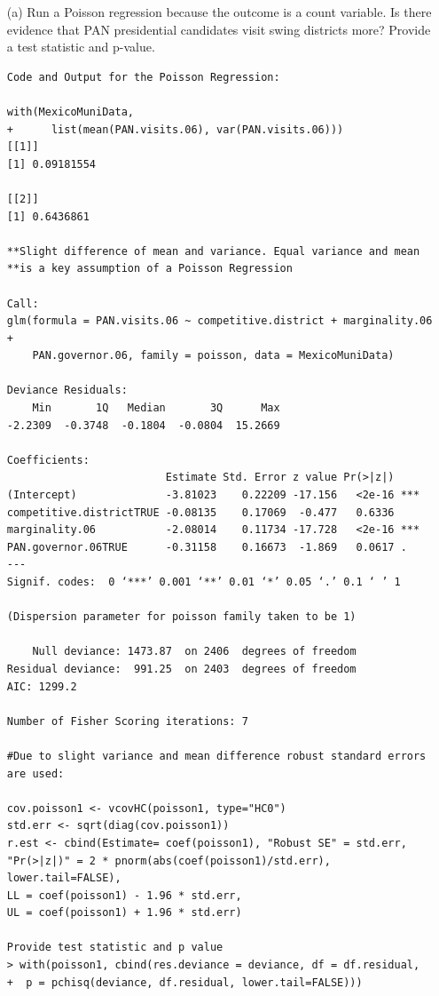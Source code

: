 \documentclass[12pt,letterpaper]{article}
\begin{document}
\begin{enumerate}
	\item [(a)]
	Run a Poisson regression because the outcome is a count variable. Is there evidence that PAN presidential candidates visit swing districts more? Provide a test statistic and p-value.

 \begin{verbatim}
Code and Output for the Poisson Regression:

with(MexicoMuniData,
+      list(mean(PAN.visits.06), var(PAN.visits.06)))
[[1]]
[1] 0.09181554

[[2]]
[1] 0.6436861

**Slight difference of mean and variance. Equal variance and mean
**is a key assumption of a Poisson Regression

Call:
glm(formula = PAN.visits.06 ~ competitive.district + marginality.06 + 
    PAN.governor.06, family = poisson, data = MexicoMuniData)

Deviance Residuals: 
    Min       1Q   Median       3Q      Max  
-2.2309  -0.3748  -0.1804  -0.0804  15.2669  

Coefficients:
                         Estimate Std. Error z value Pr(>|z|)    
(Intercept)              -3.81023    0.22209 -17.156   <2e-16 ***
competitive.districtTRUE -0.08135    0.17069  -0.477   0.6336    
marginality.06           -2.08014    0.11734 -17.728   <2e-16 ***
PAN.governor.06TRUE      -0.31158    0.16673  -1.869   0.0617 .  
---
Signif. codes:  0 ‘***’ 0.001 ‘**’ 0.01 ‘*’ 0.05 ‘.’ 0.1 ‘ ’ 1

(Dispersion parameter for poisson family taken to be 1)

    Null deviance: 1473.87  on 2406  degrees of freedom
Residual deviance:  991.25  on 2403  degrees of freedom
AIC: 1299.2

Number of Fisher Scoring iterations: 7

#Due to slight variance and mean difference robust standard errors are used:

cov.poisson1 <- vcovHC(poisson1, type="HC0")
std.err <- sqrt(diag(cov.poisson1))
r.est <- cbind(Estimate= coef(poisson1), "Robust SE" = std.err,
"Pr(>|z|)" = 2 * pnorm(abs(coef(poisson1)/std.err), 
lower.tail=FALSE),
LL = coef(poisson1) - 1.96 * std.err,
UL = coef(poisson1) + 1.96 * std.err)

Provide test statistic and p value
> with(poisson1, cbind(res.deviance = deviance, df = df.residual,
+  p = pchisq(deviance, df.residual, lower.tail=FALSE)))
   

\end{verbatim}
\end{enumerate}
\end{document}
